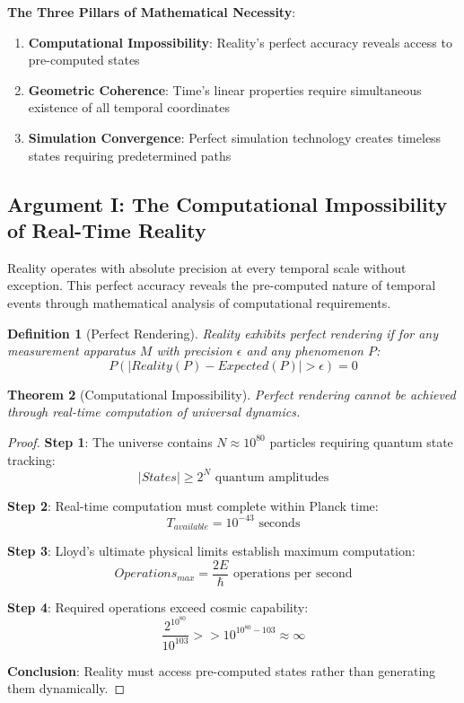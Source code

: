 \documentclass[11pt]{article}
\newtheorem{theorem}{Theorem}[section]
\newtheorem{definition}[theorem]{Definition}
\theoremstyle{remark}
\begin{document}
\textbf{The Three Pillars of Mathematical Necessity}:
\begin{enumerate}
\item \textbf{Computational Impossibility}: Reality's perfect accuracy reveals access to pre-computed states
\item \textbf{Geometric Coherence}: Time's linear properties require simultaneous existence of all temporal coordinates
\item \textbf{Simulation Convergence}: Perfect simulation technology creates timeless states requiring predetermined paths
\end{enumerate}

\subsection{Argument I: The Computational Impossibility of Real-Time Reality}

Reality operates with absolute precision at every temporal scale without exception. This perfect accuracy reveals the pre-computed nature of temporal events through mathematical analysis of computational requirements.

\begin{definition}[Perfect Rendering]
Reality exhibits perfect rendering if for any measurement apparatus $M$ with precision $\epsilon$ and any phenomenon $P$:
$$P(|Reality(P) - Expected(P)| > \epsilon) = 0$$
\end{definition}

\begin{theorem}[Computational Impossibility]
Perfect rendering cannot be achieved through real-time computation of universal dynamics.
\end{theorem}

\begin{proof}
\textbf{Step 1}: The universe contains $N \approx 10^{80}$ particles requiring quantum state tracking:
$$|States| \geq 2^{N} \text{ quantum amplitudes}$$

\textbf{Step 2}: Real-time computation must complete within Planck time:
$$T_{available} = 10^{-43} \text{ seconds}$$

\textbf{Step 3}: Lloyd's ultimate physical limits establish maximum computation:
$$Operations_{max} = \frac{2E}{\hbar} \text{ operations per second}$$

\textbf{Step 4}: Required operations exceed cosmic capability:
$$\frac{2^{10^{80}}}{10^{103}} >> 10^{10^{80}-103} \approx \infty$$

\textbf{Conclusion}: Reality must access pre-computed states rather than generating them dynamically.
\end{proof}
\end{document}
